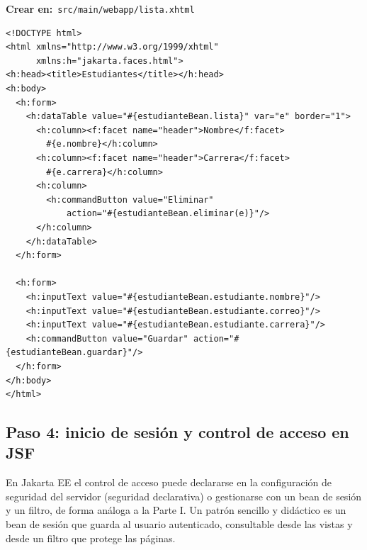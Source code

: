 \documentclass[11pt]{article}
\begin{document}
{\small\color{jwebazulo}\textbf{Crear en:}~}\texttt{src/\allowbreak{}main/\allowbreak{}webapp/\allowbreak{}lista.\allowbreak{}xhtml}\par\nobreak\vspace{-1pt}
\begin{cajacodigo}
\begin{lstlisting}[style=xml]
<!DOCTYPE html>
<html xmlns="http://www.w3.org/1999/xhtml"
      xmlns:h="jakarta.faces.html">
<h:head><title>Estudiantes</title></h:head>
<h:body>
  <h:form>
    <h:dataTable value="#{estudianteBean.lista}" var="e" border="1">
      <h:column><f:facet name="header">Nombre</f:facet>
        #{e.nombre}</h:column>
      <h:column><f:facet name="header">Carrera</f:facet>
        #{e.carrera}</h:column>
      <h:column>
        <h:commandButton value="Eliminar"
            action="#{estudianteBean.eliminar(e)}"/>
      </h:column>
    </h:dataTable>
  </h:form>

  <h:form>
    <h:inputText value="#{estudianteBean.estudiante.nombre}"/>
    <h:inputText value="#{estudianteBean.estudiante.correo}"/>
    <h:inputText value="#{estudianteBean.estudiante.carrera}"/>
    <h:commandButton value="Guardar" action="#{estudianteBean.guardar}"/>
  </h:form>
</h:body>
</html>
\end{lstlisting}
\end{cajacodigo}
\vspace{2pt}
\subsection{Paso 4: inicio de sesión y control de acceso en JSF}
En Jakarta EE el control de acceso puede declararse en la configuración de seguridad del servidor (seguridad declarativa) o gestionarse con un bean de sesión y un filtro, de forma análoga a la Parte I. Un patrón sencillo y didáctico es un bean de sesión que guarda al usuario autenticado, consultable desde las vistas y desde un filtro que protege las páginas.
\end{document}

